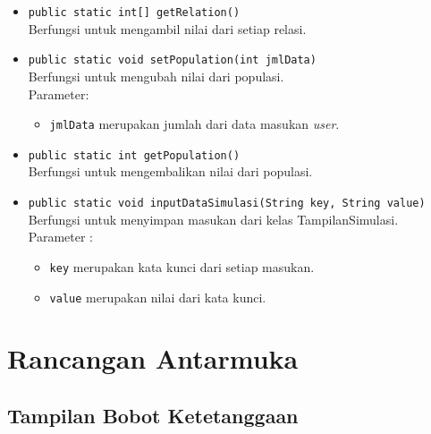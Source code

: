 \begin{itemize}
		\item \texttt{public static int[] getRelation()}\\
		Berfungsi untuk mengambil nilai dari setiap relasi.
		
		\item \texttt{public static void setPopulation(int jmlData)}\\
		Berfungsi untuk mengubah nilai dari populasi.\\
		Parameter:
		\begin{itemize}
			\item \texttt{jmlData} merupakan jumlah dari data masukan \textit{user}.
		\end{itemize}
		
		\item \texttt{public static int getPopulation()}\\
		Berfungsi untuk mengembalikan nilai dari populasi.
		
		\item \texttt{public static void inputDataSimulasi(String key, String value)}\\
		Berfungsi untuk menyimpan masukan dari kelas TampilanSimulasi.\\
		Parameter :
		\begin{itemize}
			\item \texttt{key} merupakan kata kunci dari setiap masukan.
			\item \texttt{value} merupakan nilai dari kata kunci.
		\end{itemize}
	\end{itemize}


\section{Rancangan Antarmuka}
\label{sec:rancanganantarmuka}

\subsection{Tampilan Bobot Ketetanggaan}

